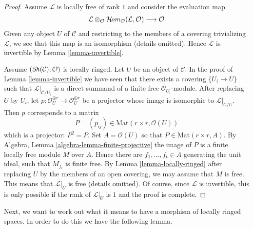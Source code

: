 \begin{proof}
Assume $\mathcal{L}$ is locally free of rank $1$ and consider the
evaluation map
$$
\mathcal{L} \otimes_\mathcal{O}
\mathop{\mathcal{H}\!\mathit{om}}\nolimits_\mathcal{O}(\mathcal{L}, \mathcal{O})
\longrightarrow \mathcal{O}
$$
Given any object $U$ of $\mathcal{C}$ and restricting to the members
of a covering trivializing $\mathcal{L}$, we see
that this map is an isomorphism (details omitted).
Hence $\mathcal{L}$ is invertible by Lemma \ref{lemma-invertible}.

\medskip\noindent
Assume $(\mathop{\mathit{Sh}}\nolimits(\mathcal{C}), \mathcal{O})$ is locally ringed.
Let $U$ be an object of $\mathcal{C}$.
In the proof of Lemma \ref{lemma-invertible}
we have seen that there exists a covering $\{U_i \to U\}$
such that $\mathcal{L}|_{\mathcal{C}/U_i}$ is a direct summand
of a finite free $\mathcal{O}_{U_i}$-module. After replacing
$U$ by $U_i$, let
$p : \mathcal{O}_U^{\oplus r} \to \mathcal{O}_U^{\oplus r}$
be a projector whose image is isomorphic to $\mathcal{L}|_{\mathcal{C}/U}$.
Then $p$ corresponds to a matrix
$$
P = (p_{ij}) \in \text{Mat}(r \times r, \mathcal{O}(U))
$$
which is a projector: $P^2  = P$. Set $A = \mathcal{O}(U)$
so that $P \in \text{Mat}(r \times r, A)$.
By Algebra, Lemma \ref{algebra-lemma-finite-projective}
the image of $P$ is a finite locally free module $M$ over $A$.
Hence there are $f_1, \ldots, f_t \in A$ generating the unit
ideal, such that $M_{f_i}$ is finite free. By
Lemma \ref{lemma-locally-ringed} after replacing $U$ by the members of an open
covering, we may assume that $M$ is free. This means that
$\mathcal{L}|_U$ is free (details omitted). Of course, since
$\mathcal{L}$ is invertible, this is
only possible if the rank of $\mathcal{L}|_U$ is $1$
and the proof is complete.
\end{proof}

\noindent
Next, we want to work out what it means to have a morphism of locally ringed
spaces. In order to do this we have the following lemma.

